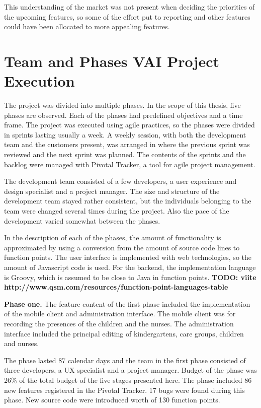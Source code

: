 This understanding of the market was not present when deciding the priorities of the upcoming features, so some of the effort put to reporting and other features could have been allocated to more appealing features.

 \section{Team and Phases VAI Project Execution}

The project was divided into multiple phases. In the scope of this thesis, five phases are observed. Each of the phases had predefined objectives and a time frame. The project was executed using agile practices, so the phases were divided in sprints lasting usually a week. A weekly session, with both the development team and the customers present, was arranged in where the previous sprint was reviewed and the next sprint was planned. The contents of the sprints and the backlog were managed with Pivotal Tracker, a tool for agile project management.

The development team consisted of a few developers, a user experience and design specialist and a project manager. The size and structure of the development team stayed rather consistent, but the individuals belonging to the team were changed several times during the project. Also the pace of the development varied somewhat between the phases.

In the description of each of the phases, the amount of functionality is approximated by using a conversion from the amount of source code lines to function points. The user interface is implemented with web technologies, so the amount of Javascript code is used. For the backend, the implementation language is Groovy, which is assumed to be close to Java in function points. \textbf{TODO: viite http://www.qsm.com/resources/function-point-languages-table}

\textbf{Phase one.} The feature content of the first phase included the implementation of the mobile client and administration interface. The mobile client was for recording the presences of the children and the nurses. The administration interface included the principal editing of kindergartens, care groups, children and nurses.

The phase lasted 87 calendar days and the team in the first phase consisted of three developers, a UX specialist and a project manager. Budget of the phase was 26\% of the total budget of the five stages presented here. The phase included 86 new features registered in the Pivotal Tracker. 17 bugs were found during this phase. New source code were introduced worth of 130 function points.

